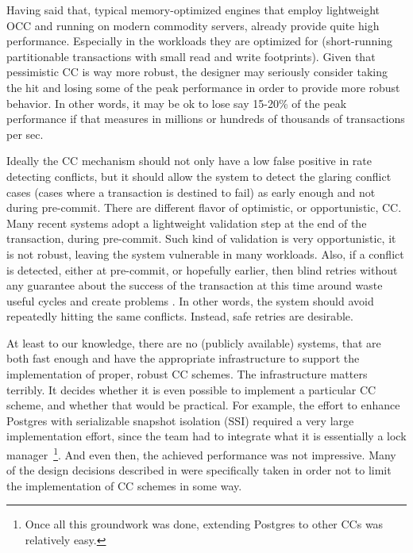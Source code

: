 Having said that, typical memory-optimized engines that employ lightweight OCC and running on modern commodity servers, already provide quite high performance. Especially in the workloads they are optimized for (short-running partitionable transactions with small read and write footprints). Given that pessimistic CC is way more robust, the designer may seriously consider taking the hit and losing some of the peak performance in order to provide more robust behavior. In other words, it may be ok to lose say 15-20\% of the peak performance if that measures in millions or hundreds of thousands of transactions per sec.

Ideally the CC mechanism should not only have a low false positive in rate detecting conflicts, but it should allow the system to detect the glaring conflict cases (cases where a transaction is destined to fail) as early enough and not during pre-commit.
There are different flavor of optimistic, or opportunistic, CC. Many recent systems adopt a lightweight validation step at the end of the transaction, during pre-commit. Such kind of validation is very opportunistic, it is not robust, leaving the system vulnerable in many workloads.
Also, if a conflict is detected, either at pre-commit, or hopefully earlier, then blind retries without any guarantee about the success of the transaction at this time around waste useful cycles and create problems \cite{PortsG12}. In other words, the system should avoid repeatedly hitting the same conflicts. Instead, safe retries are desirable. 

At least to our knowledge, there are no (publicly available) systems, that are both fast enough and have the appropriate infrastructure to support the implementation of proper, robust CC schemes. The infrastructure matters terribly. It decides whether it is even possible to implement a particular CC scheme, and whether that would be practical. For example, the effort to enhance Postgres with serializable snapshot isolation (SSI) required a very large implementation effort, since the team had to integrate what it is essentially a lock manager~\footnote{    Once all this groundwork was done, extending Postgres to other CCs was relatively easy.}. And even then, the achieved performance was not impressive.  Many of the design decisions described in  were specifically taken in order not to limit the implementation of CC schemes in some way.

